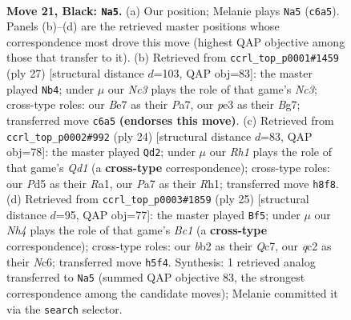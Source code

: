 \documentclass[11pt]{article}
\begin{document}
\clearpage

\begin{figure}[p]\centering
\begin{subfigure}{0.46\textwidth}\centering
\resizebox{\linewidth}{!}{%
\newchessgame
\chessboard[
  setfen={rqb1k2r/p3b1pp/1pn5/3p1p1n/Pp1P3P/4PNPB/RBQ2P2/1N2R1K1 b - - 6 21},
  showmover=false,
  pgfstyle=straightmove, color=movearrow, markmove={c6-a5}
]}
\caption{}
\end{subfigure}\hfill
\begin{subfigure}{0.46\textwidth}\centering
\resizebox{\linewidth}{!}{%
\newchessgame
\chessboard[
  setfen={r1bq1rk1/ppp3bp/2np2p1/5p1n/2PP4/1PN1PQPB/P5NP/R1B2RK1 b - - 0 14},
  showmover=false,
  pgfstyle=straightmove, color=movearrow, markmove={c6-b4}
]}
\caption{}
\end{subfigure}
\\[4pt]
\begin{subfigure}{0.46\textwidth}\centering
\resizebox{\linewidth}{!}{%
\newchessgame
\chessboard[
  setfen={rnbqnrk1/p4pbp/1p1p2p1/2pP4/2N1PBP1/2N4P/PP3P2/R2QKB1R w KQ - 3 13},
  showmover=false,
  pgfstyle=straightmove, color=movearrow, markmove={d1-d2}
]}
\caption{}
\end{subfigure}\hfill
\begin{subfigure}{0.46\textwidth}\centering
\resizebox{\linewidth}{!}{%
\newchessgame
\chessboard[
  setfen={r1b2rk1/ppq2pp1/2n2n1p/2p1p3/P1BP4/2P1PN1P/5PP1/R1BQR1K1 b - - 0 13},
  showmover=false,
  pgfstyle=straightmove, color=movearrow, markmove={c8-f5}
]}
\caption{}
\end{subfigure}
\caption{\textbf{Move 21, Black: \texttt{Na5}.} (a) Our position; Melanie plays \texttt{Na5} (\texttt{c6a5}). Panels (b)--(d) are the retrieved master positions whose correspondence most drove this move (highest QAP objective among those that transfer to it). (b) Retrieved from \texttt{ccrl\_top\_p0001\#1459} (ply 27) [structural distance $d$=103, QAP obj=83]: the master played \texttt{Nb4}; under $\mu$ our \emph{Nc3} plays the role of that game's \emph{Nc3}; cross-type roles: our \emph{B}e7 as their \emph{P}a7, our \emph{p}e3 as their \emph{B}g7; transferred move \texttt{c6a5} \textbf{(endorses this move)}. (c) Retrieved from \texttt{ccrl\_top\_p0002\#992} (ply 24) [structural distance $d$=83, QAP obj=78]: the master played \texttt{Qd2}; under $\mu$ our \emph{Rh1} plays the role of that game's \emph{Qd1} (a \textbf{cross-type} correspondence); cross-type roles: our \emph{P}d5 as their \emph{R}a1, our \emph{P}a7 as their \emph{R}h1; transferred move \texttt{h8f8}. (d) Retrieved from \texttt{ccrl\_top\_p0003\#1859} (ply 25) [structural distance $d$=95, QAP obj=77]: the master played \texttt{Bf5}; under $\mu$ our \emph{Nh4} plays the role of that game's \emph{Bc1} (a \textbf{cross-type} correspondence); cross-type roles: our \emph{b}b2 as their \emph{Q}c7, our \emph{q}c2 as their \emph{N}c6; transferred move \texttt{h5f4}. Synthesis: 1 retrieved analog transferred to \texttt{Na5} (summed QAP objective 83, the strongest correspondence among the candidate moves); Melanie committed it via the \texttt{search} selector.}
\label{fig:thought-m41}
\end{figure}
\end{document}
